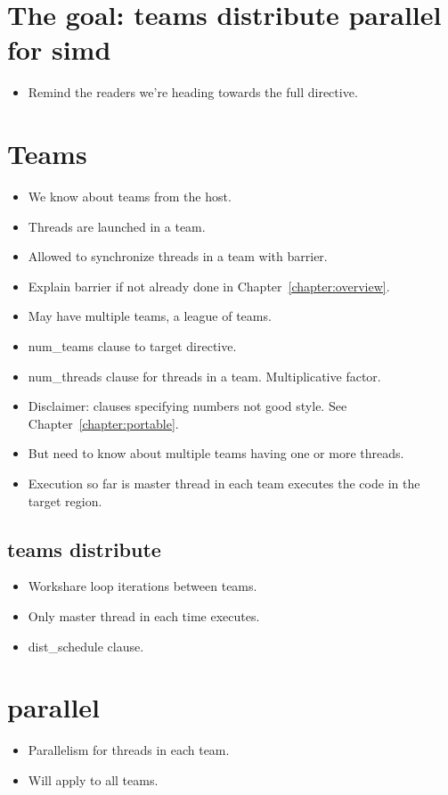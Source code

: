 \section{The goal: teams distribute parallel for simd}
\begin{itemize}
  \item Remind the readers we're heading towards the full directive.
\end{itemize}

\section{Teams}
\begin{itemize}
  \item We know about teams from the host.
  \item Threads are launched in a team.
  \item Allowed to synchronize threads in a team with barrier.
  \item Explain barrier if not already done in Chapter~\ref{chapter:overview}.
  \item May have multiple teams, a league of teams.
  \item num\_teams clause to target directive.
  \item num\_threads clause for threads in a team. Multiplicative factor.
  \item Disclaimer: clauses specifying numbers not good style. See Chapter~\ref{chapter:portable}.
  \item But need to know about multiple teams having one or more threads.
  \item Execution so far is master thread in each team executes the code in the target region.
\end{itemize}

\subsection{teams distribute}
\begin{itemize}
  \item Workshare loop iterations between teams.
  \item Only master thread in each time executes.
  \item dist\_schedule clause.
\end{itemize}

\section{parallel}
\begin{itemize}
  \item Parallelism for threads in each team.
  \item Will apply to all teams.
\end{itemize}

